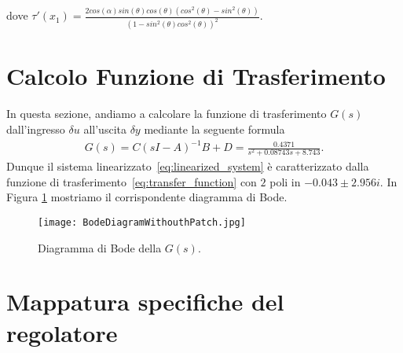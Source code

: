 \documentclass[a4paper, 11pt]{article}
\begin{document}
	dove $\tau'(x_1)=\frac{2cos(\alpha)sin(\theta)cos(\theta)(cos^2(\theta)-sin^2(\theta))}{(1-sin^2(\theta)cos^2(\theta))^2}$.
	\section{Calcolo Funzione di Trasferimento}
	
	In questa sezione, andiamo a calcolare la funzione di trasferimento $G(s)$ dall'ingresso $\delta u$ all'uscita $\delta y$ mediante la seguente formula 
	\begin{align}\label{eq:transfer_function}
		G(s) = C(sI - A)^{-1}B+D = \frac{0.4371}{s^2 + 0.08743 s + 8.743}.
	\end{align}
	Dunque il sistema linearizzato~\eqref{eq:linearized_system} è caratterizzato dalla funzione di trasferimento~\eqref{eq:transfer_function} con $2$ poli in $-0.043 \pm 2.956i$. In Figura \ref{fig:G} mostriamo il corrispondente diagramma di Bode. 
	
	\begin{figure}[h]
		\centering
		\texttt{[image: BodeDiagramWithouthPatch.jpg]}
		\caption{Diagramma di Bode della $G(s)$.}
		\label{fig:G}
	\end{figure}
	
	\newcommand{\dB}{\text{dB}}
	
	\section{Mappatura specifiche del regolatore}
	\label{sec:specifications}
	
\end{document}
